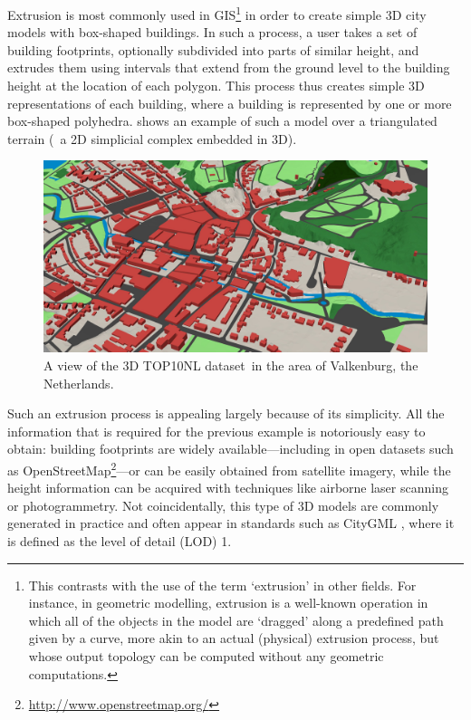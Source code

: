 Extrusion is most commonly used in GIS\footnote{This contrasts with the use of the term `extrusion' in other fields.
For instance, in geometric modelling, extrusion is a well-known operation in which all of the objects in the model are `dragged' along a predefined path given by a curve, more akin to an actual (physical) extrusion process, but whose output topology can be computed without any geometric computations.} in order to create simple 3D city models with box-shaped buildings.
In such a process, a user takes a set of building footprints, optionally subdivided into parts of similar height, and extrudes them using intervals that extend from the ground level to the building height at the location of each polygon.
This process thus creates simple 3D representations of each building, where a building is represented by one or more box-shaped polyhedra.
 shows an example of such a model over a triangulated terrain (\ie\ a 2D simplicial complex embedded in 3D).
\begin{figure}
\centering
\includegraphics[width=\linewidth]{figs/3dtop10nl}
\caption[A view of the 3D TOP10NL dataset]{A view of the 3D TOP10NL dataset\protect\footnotemark\ in the area of Valkenburg, the Netherlands.}
\label{fig:3dtop10nl}
\end{figure}

Such an extrusion process is appealing largely because of its simplicity.
All the information that is required for the previous example is notoriously easy to obtain: building footprints are widely available---including in open datasets such as OpenStreetMap\footnote{\url{http://www.openstreetmap.org/}}---or can be easily obtained from satellite imagery, while the height information can be acquired with techniques like airborne laser scanning or photogrammetry.
Not coincidentally, this type of 3D models are commonly generated in practice and often appear in standards such as CityGML \citep{CityGML2}, where it is defined as the level of detail (LOD) 1.

